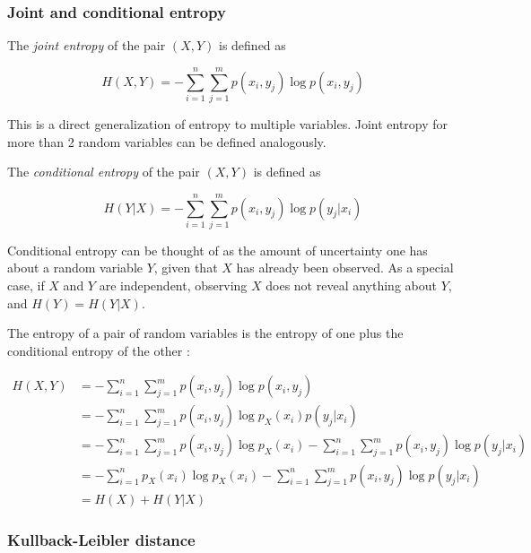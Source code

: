 \documentclass[12pt]{article}
\begin{document}
\subsubsection{Joint and conditional entropy}

The \textit{joint entropy} \cite{cover-thomas} of the pair $(X,Y)$ is defined as 

\begin{equation}
H(X,Y) = -\sum_{i=1}^n \sum_{j=1}^m p(x_i,y_j) \log p(x_i,y_j)
\label{eq:cond-etropy}
\end{equation}

This is a direct generalization of entropy to multiple variables. Joint entropy for more than 2 random variables can be defined analogously.

The \textit{conditional entropy} \cite{cover-thomas} of the pair $(X,Y)$ is defined as 

\begin{equation}
H(Y|X) = - \sum_{i=1}^n \sum_{j=1}^m p(x_i,y_j) \log p(y_j|x_i)
\end{equation}

Conditional entropy can be thought of as the amount of uncertainty one has about a random variable $Y$, given that $X$ has already been observed. As a special case, if $X$ and $Y$ are independent, observing $X$ does not reveal anything about $Y$, and $H(Y) = H(Y|X)$.

The entropy of a pair of random variables is the entropy of one plus the conditional entropy of the other \cite{cover-thomas}: 

\begin{align}
H(X,Y) & = -\sum_{i=1}^n \sum_{j=1}^m p(x_i,y_j) \log p(x_i,y_j) \nonumber \\
 	   & = -\sum_{i=1}^n \sum_{j=1}^m p(x_i,y_j) \log p_X(x_i)p(y_j|x_i) \nonumber \\ 
 	   & = -\sum_{i=1}^n \sum_{j=1}^m p(x_i,y_j) \log p_X(x_i) - \sum_{i=1}^n \sum_{j=1}^m p(x_i,y_j) \log p(y_j|x_i) \nonumber \\
 	   & = -\sum_{i=1}^n p_X(x_i) \log p_X(x_i) - \sum_{i=1}^n \sum_{j=1}^m p(x_i,y_j) \log p(y_j|x_i) \nonumber \\ 
 	   & = H(X) + H(Y|X)
\label{eq:chain-rule-entropy}
\end{align}

\subsubsection{Kullback-Leibler distance}
\end{document}
